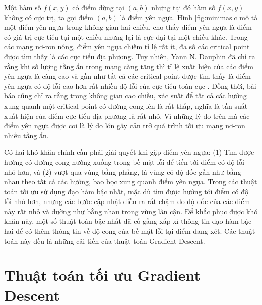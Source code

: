 Một hàm số $f(x,y)$ có điểm dừng tại $(a,b)$ nhưng tại đó hàm số $f(x,y)$ không có cực trị, ta gọi điểm $(a,b)$ là điểm yên ngựa. Hình \ref{fig:minimas}c mô tả một điểm yên ngựa trong không gian hai chiều, cho thấy điểm yên ngựa là điểm có giá trị cực tiểu tại một chiều nhưng lại là cực đại tại một chiều khác. Trong các mạng nơ-ron nông, điểm yên ngựa chiếm tỉ lệ rất ít, đa số các critical point được tìm thấy là các cực tiểu địa phương. Tuy nhiên, Yann N. Dauphin đã chỉ ra rằng khi số lượng tầng ẩn trong mạng càng tăng thì tỉ lệ xuất hiện của các điểm yên ngựa là càng cao và gần như tất cả các critical point được tìm thấy là điểm yên ngựa có độ lỗi cao hơn rất nhiều độ lỗi của cực tiểu toàn cục \cite{dauphin2014identifying}. Đồng thời, bài báo cũng chỉ ra rằng trong không gian cao chiều, xác suất để tất cả các hướng xung quanh một critical point có đường cong lên là rất thấp, nghĩa là tần suất xuất hiện của điểm cực tiểu địa phương là rất nhỏ. Vì những lý do trên mà các điểm yên ngựa được coi là lý do lớn gây cản trở quá trình tối ưu mạng nơ-ron nhiều tầng ẩn.

Có hai khó khăn chính cần phải giải quyết khi gặp điểm yên ngựa: (1) Tìm được hướng có đường cong hướng xuống trong bề mặt lỗi để tiến tới điểm có độ lỗi nhỏ hơn, và (2) vượt qua vùng bằng phẳng, là vùng có độ dốc gần như bằng nhau theo tất cả các hướng, bao bọc xung quanh điểm yên ngựa. Trong các thuật toán tối ưu sử dụng đạo hàm bậc nhất, mặc dù tìm được hướng tới điểm có độ lỗi nhỏ hơn, nhưng các bước cập nhật diễn ra rất chậm do độ dốc của các điểm này rất nhỏ và dường như bằng nhau trong vùng lân cận. Để khắc phục được khó khăn này, một số thuật toán bậc nhất đã cố gắng xấp xỉ thông tin đạo hàm bậc hai để có thêm thông tin về độ cong của bề mặt lỗi tại điểm đang xét. Các thuật toán này đều là những cải tiến của thuật toán Gradient Descent.

\section{Thuật toán tối ưu Gradient Descent}

